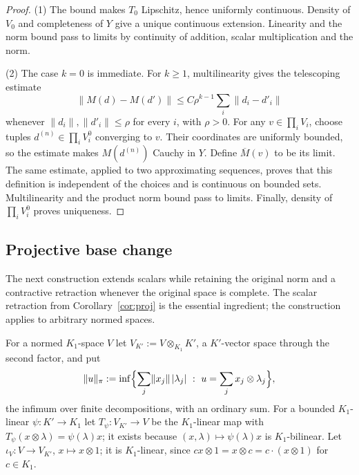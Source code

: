 \documentclass[11pt]{amsart}
\theoremstyle{definition}
\theoremstyle{remark}
\numberwithin{equation}{section}
\newcommand{\abs}[1]{\lvert #1\rvert}
\newcommand{\norm}[1]{\lVert #1\rVert}
\theoremstyle{plain}
\theoremstyle{definition}
\theoremstyle{plain}
\begin{document}
\begin{proof}
(1) The bound makes $T_0$ Lipschitz, hence uniformly continuous. Density of $V_0$ and completeness of $Y$ give a
unique continuous extension. Linearity and the norm bound pass to limits by continuity of addition, scalar
multiplication and the norm.

(2) The case $k=0$ is immediate. For $k\ge1$, multilinearity gives the telescoping estimate
\[
\norm{M(d)-M(d')}\le C\rho^{k-1}\sum_i\norm{d_i-d'_i}
\]
whenever $\norm{d_i},\norm{d'_i}\le\rho$ for every $i$, with $\rho>0$. For any $v\in\prod_iV_i$, choose tuples
$d^{(n)}\in\prod_iV_i^0$ converging to $v$. Their coordinates are uniformly bounded, so the estimate makes
$M(d^{(n)})$ Cauchy in $Y$. Define $\overline M(v)$ to be its limit. The same estimate, applied to two approximating
sequences, proves that this definition is independent of the choices and is continuous on bounded sets.
Multilinearity and the product norm bound pass to limits. Finally, density of $\prod_iV_i^0$ proves uniqueness.
\end{proof}

\subsection{Projective base change}
The next construction extends scalars while retaining the original norm and a contractive retraction whenever
the original space is complete. The scalar retraction from Corollary~\ref{cor:proj} is the essential ingredient;
the construction applies to arbitrary normed spaces.

For a normed $K_1$\nobreakdash-space $V$ let $V_{K'}:=V\otimes_{K_1}K'$, a $K'$\nobreakdash-vector space through the second factor, and put
\[
\norm u_\pi:=\inf\Bigl\{\sum_j\norm{x_j}\,\abs{\lambda_j}\ :\ u=\sum_jx_j\otimes\lambda_j\Bigr\},
\]
the infimum over finite decompositions, with an ordinary sum. For a bounded $K_1$\nobreakdash-linear $\psi\colon K'\to K_1$ let
$T_\psi\colon V_{K'}\to V$ be the $K_1$\nobreakdash-linear map with $T_\psi(x\otimes\lambda)=\psi(\lambda)x$; it exists because
$(x,\lambda)\mapsto\psi(\lambda)x$ is $K_1$\nobreakdash-bilinear. Let $\iota_V\colon V\to V_{K'}$, $x\mapsto x\otimes1$; it is
$K_1$\nobreakdash-linear, since $cx\otimes1=x\otimes c=c\cdot(x\otimes1)$ for $c\in K_1$.
\end{document}
